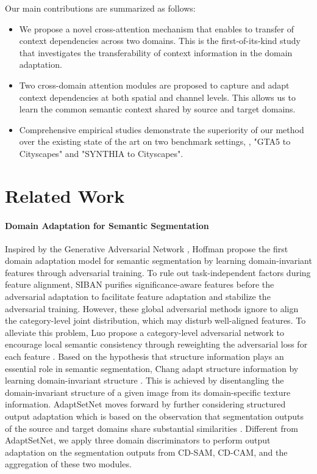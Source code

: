 \documentclass[10pt,twocolumn,letterpaper]{article}
\begin{document}
	Our main contributions are summarized as follows:
	\begin{itemize}
		\item We propose a novel cross-attention mechanism that enables to transfer of context dependencies across two domains. This is the first-of-its-kind study that investigates the transferability of context information in the domain adaptation.
		\item Two cross-domain attention modules are proposed to capture and adapt context dependencies at both spatial and channel levels. This allows us to learn the common semantic context shared by source and target domains.
		\item Comprehensive empirical studies demonstrate the superiority of our method over the existing state of the art on two benchmark settings, \ie, "GTA5 to Cityscapes" and "SYNTHIA to Cityscapes".
	\end{itemize}


\section{Related Work}
	\paragraph{Domain Adaptation for Semantic Segmentation}

	Inspired by the Generative Adversarial Network \cite{goodfellow2014generative}, Hoffman \etal \cite{hoffman2016fcns} propose the first domain adaptation model for semantic segmentation by learning domain-invariant features through adversarial training. To rule out task-independent factors during feature alignment, SIBAN \cite{luo2019significance} purifies significance-aware features before the adversarial adaptation to facilitate feature adaptation and stabilize the adversarial training. However, these global adversarial methods ignore to align the category-level joint distribution, which may disturb well-aligned features. To alleviate this problem, Luo \etal propose a category-level adversarial network to encourage local semantic consistency through reweighting the adversarial loss for each feature \cite{luo2019taking}. Based on the hypothesis that structure information plays an essential role in semantic segmentation, Chang \etal adapt structure information by learning domain-invariant structure \cite{chang2019all}. This is achieved by disentangling the domain-invariant structure of a given image from its domain-specific texture information. AdaptSetNet moves forward by further considering structured output adaptation which is based on the observation that segmentation outputs of the source and target domains share substantial similarities \cite{tsai2018learning}. Different from AdaptSetNet, we apply three domain discriminators to perform output adaptation on the segmentation outputs from CD-SAM, CD-CAM, and the aggregation of these two modules.
\end{document}
